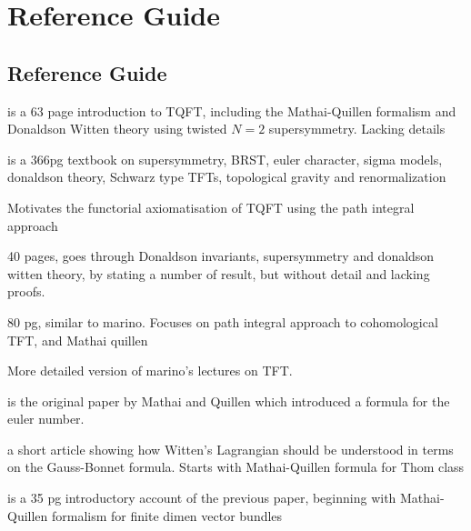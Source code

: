 
\chapter{Reference Guide}
\label{appendix1}

\section{Reference Guide}
\cite{cernTQFT} is a 63 page introduction to TQFT, including the Mathai-Quillen
formalism and Donaldson Witten theory using twisted $N=2$ supersymmetry.
Lacking details

\cite{birminghamTFT} is a 366pg textbook on supersymmetry, BRST, euler
character, sigma models, donaldson theory, Schwarz type TFTs, topological
gravity and renormalization

\cite{axiomTQFTintro} Motivates the functorial axiomatisation of TQFT using the
path integral approach

\cite{marino} 40 pages, goes through Donaldson invariants, supersymmetry and donaldson
witten theory, by stating a number of result, but without detail and lacking
proofs. 

\cite{moore} 80 pg, similar to marino. Focuses on path integral approach to
cohomological TFT, and Mathai quillen

\cite{TQFTbook} More detailed version of marino's lectures on TFT. 

\cite{MQformula} is the original paper by Mathai and Quillen which introduced a
formula for the euler number.

\cite{atiyahlagrangians} a short article showing how Witten's Lagrangian should
be understood in terms on the Gauss-Bonnet formula. Starts with Mathai-Quillen
formula for Thom class

\cite{MQintro} is a 35 pg introductory account of the previous paper, beginning
with Mathai-Quillen formalism for finite dimen vector bundles




